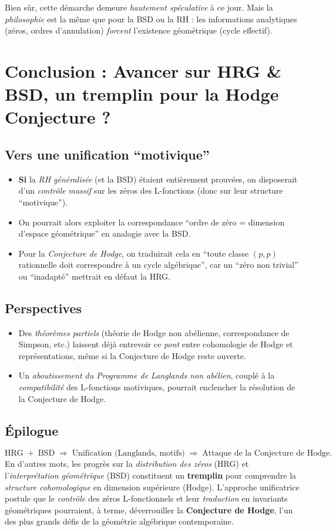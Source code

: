 \documentclass[11pt]{article}
\begin{document}
Bien sûr, cette démarche demeure \emph{hautement spéculative} à ce jour. Mais la \emph{philosophie} est la même que pour la BSD ou la RH : les informations analytiques (zéros, ordres d'annulation) \emph{forcent} l'existence géométrique (cycle effectif).

\section{Conclusion : Avancer sur HRG \& BSD, un tremplin pour la Hodge Conjecture ?}

\subsection{Vers une unification “motivique”}
\begin{itemize}
  \item \textbf{Si} la \emph{RH généralisée} (et la BSD) étaient entièrement prouvées, on disposerait d'un \emph{contrôle massif} sur les zéros des L-fonctions (donc sur leur structure “motivique”).
  \item On pourrait alors exploiter la correspondance “ordre de zéro = dimension d'espace géométrique” en analogie avec la BSD. 
  \item Pour la \emph{Conjecture de Hodge}, on traduirait cela en “toute classe \((p,p)\) rationnelle doit correspondre à un cycle algébrique”, car un “zéro non trivial” ou “inadapté” mettrait en défaut la HRG.
\end{itemize}

\subsection{Perspectives}
\begin{itemize}
  \item Des \emph{théorèmes partiels} (théorie de Hodge non abélienne, correspondance de Simpson, etc.) laissent déjà entrevoir ce \emph{pont} entre cohomologie de Hodge et représentations, même si la Conjecture de Hodge reste ouverte.
  \item Un \emph{aboutissement du Programme de Langlands non abélien}, couplé à la \emph{compatibilité} des L-fonctions motiviques, pourrait enclencher la résolution de la Conjecture de Hodge.
\end{itemize}

\subsection{Épilogue}
\[
  \text{HRG} \;+\; \text{BSD}
  \;\Longrightarrow\;
  \text{Unification (Langlands, motifs)}
  \;\Longrightarrow\;
  \text{Attaque de la Conjecture de Hodge}.
\]
\noindent
En d'autres mots, les progrès sur la \emph{distribution des zéros} (HRG) et l'\emph{interprétation géométrique} (BSD) constituent un \textbf{tremplin} pour comprendre la \emph{structure cohomologique} en dimension supérieure (Hodge). L'approche unificatrice postule que le \emph{contrôle} des zéros L-fonctionnels et leur \emph{traduction} en invariants géométriques pourraient, à terme, déverrouiller la \textbf{Conjecture de Hodge}, l'un des plus grands défis de la géométrie algébrique contemporaine.
\end{document}
